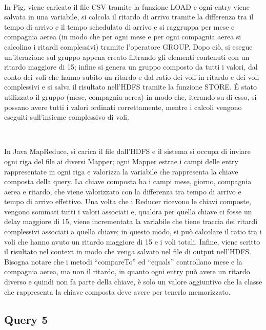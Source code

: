 \documentclass[11pt]{article} %
\begin{document}
~

In Pig, viene caricato il file CSV tramite la funzione LOAD e ogni entry viene salvata in una variabile, si calcola il ritardo di arrivo tramite la differenza tra il tempo di arrivo e il tempo schedulato di arrivo e si raggruppa per mese e compagnia aerea (in modo che per ogni mese e per ogni compagnia aerea si calcolino i ritardi complessivi) tramite l'operatore GROUP. Dopo ciò, si esegue un'iterazione sul gruppo appena creato filtrando gli elementi contenuti con un ritardo maggiore di 15; infine si genera un gruppo composto da tutti i valori, dal conto dei voli che hanno subito un ritardo e dal ratio dei voli in ritardo e dei voli complessivi e si salva il risultato nell'HDFS tramite la funzione STORE. \'E stato utilizzato il gruppo (mese, compagnia aerea) in modo che, iterando su di esso, si possano avere tutti i valori ordinati correttamente, mentre i calcoli vengono eseguiti sull'insieme complessivo di voli. 

~

In Java MapReduce, si carica il file dall'HDFS e il sistema si occupa di inviare ogni riga del file ai diversi Mapper; ogni Mapper estrae i campi delle entry rappresentate in ogni riga e valorizza la variabile che rappresenta la chiave composta della query. La chiave composta ha i campi mese, giorno, compagnia aerea e ritardo, che viene valorizzato con la differenza tra tempo di arrivo e tempo di arrivo effettivo. Una volta che i Reducer ricevono le chiavi composte, vengono sommati tutti i valori associati e, qualora per quella chiave ci fosse un delay maggiore di 15, viene incrementata la variabile che tiene traccia dei ritardi complessivi associati a quella chiave; in questo modo, si può calcolare il ratio tra i voli che hanno avuto un ritardo maggiore di 15 e i voli totali. Infine, viene scritto il risultato nel context in modo che venga salvato nel file di output nell'HDFS.  Bisogna notare che i metodi ``compareTo'' ed ``equals'' controllano mese e la compagnia aerea, ma non il ritardo, in quanto ogni entry può avere un ritardo diverso e quindi non fa parte della chiave, è solo un valore aggiuntivo che la classe che rappresenta la chiave composta deve avere per tenerlo memorizzato. 


\subsection{Query 5}
\end{document}
